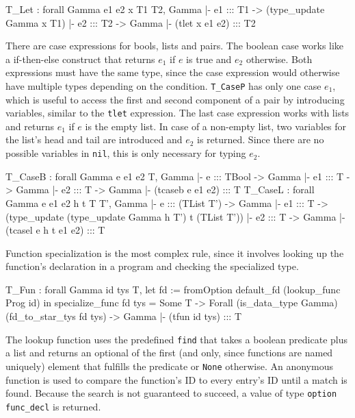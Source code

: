\documentclass[paper = a4, fleqn, abstract=on, twoside]{scrreprt}
\newcommand{\coqinline}[1]{\texttt{#1}}
\begin{document}
\begin{coqcode}
T_Let : forall Gamma e1 e2 x T1 T2,
          Gamma |- e1 ::: T1 -> (type_update Gamma x T1) |- e2 ::: T2 ->
          Gamma |- (tlet x e1 e2) ::: T2
\end{coqcode}
There are case expressions for bools, lists and pairs. The boolean case works like a if-then-else construct that returns $e_{1}$ if $e$ is true and $e_{2}$ otherwise. Both expressions must have the same type, since the case expression would otherwise have multiple types depending on the condition. \coqinline{T_CaseP} has only one case $e_{1}$, which is useful to access the first and second component of a pair by introducing variables, similar to the \coqinline{tlet} expression. The last case expression works with lists and returns $e_{1}$ if $e$ is the empty list. In case of a non-empty list, two variables for the list's head and tail are introduced and $e_{2}$ is returned. Since there are no possible variables in \coqinline{nil}, this is only necessary for typing $e_{2}$.
\begin{coqcode}
T_CaseB : forall Gamma e e1 e2 T,
            Gamma |- e ::: TBool -> Gamma |- e1 ::: T -> Gamma |- e2 ::: T ->
            Gamma |- (tcaseb e e1 e2) ::: T
T_CaseL : forall Gamma e e1 e2 h t T T',
            Gamma |- e ::: (TList T') -> Gamma |- e1 ::: T ->
            (type_update (type_update Gamma h T') t (TList T')) |- e2 ::: T ->
            Gamma |- (tcasel e h t e1 e2) ::: T
\end{coqcode}
Function specialization is the most complex rule, since it involves looking up the function's declaration in a program and checking the specialized type.
\begin{coqcode}
T_Fun : forall Gamma id tys T,
          let fd := fromOption default_fd (lookup_func Prog id) in 
          specialize_func fd tys = Some T ->
          Forall (is_data_type Gamma) (fd_to_star_tys fd tys) ->
          Gamma |- (tfun id tys) ::: T
\end{coqcode}
The lookup function uses the predefined \coqinline{find} that takes a boolean predicate plus a list and returns an optional of the first (and only, since functions are named uniquely) element that fulfills the predicate or \coqinline{None} otherwise. An anonymous function is used to compare the function's ID to every entry's ID until a match is found. Because the search is not guaranteed to succeed, a value of type \coqinline{option func_decl} is returned.\\
\par \noindent
\end{document}
